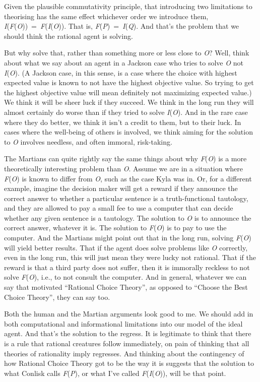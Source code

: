 \documentclass[
  11pt,
  letterpaper,
  DIV=11,
  numbers=noendperiod,
  twoside]{scrartcl}
\begin{document}
Given the plausible commutativity principle, that introducing two
limitations to theorising has the same effect whichever order we
introduce them,
\emph{I}(\emph{F}(\emph{O}))~=~\emph{F}(\emph{I}(\emph{O})). That is,
\emph{F}(\emph{P})~=~\emph{I}(\emph{Q}). And that's the problem that we
should think the rational agent is solving.

But why solve that, rather than something more or less close to
\emph{O}? Well, think about what we say about an agent in a Jackson case
who tries to solve \emph{O} not \emph{I}(\emph{O}). (A Jackson case, in
this sense, is a case where the choice with highest expected value is
known to not have the highest objective value. So trying to get the
highest objective value will mean definitely not maximizing expected
value.) We think it will be sheer luck if they succeed. We think in the
long run they will almost certainly do worse than if they tried to solve
\emph{I}(\emph{O}). And in the rare case where they do better, we think
it isn't a credit to them, but to their luck. In cases where the
well-being of others is involved, we think aiming for the solution to
\emph{O} involves needless, and often immoral, risk-taking.

The Martians can quite rightly say the same things about why
\emph{F}(\emph{O}) is a more theoretically interesting problem than
\emph{O}. Assume we are in a situation where \emph{F}(\emph{O}) is known
to differ from \emph{O}, such as the case Kyla was in. Or, for a
different example, imagine the decision maker will get a reward if they
announce the correct answer to whether a particular sentence is a
truth-functional tautology, and they are allowed to pay a small fee to
use a computer that can decide whether any given sentence is a
tautology. The solution to \emph{O} is to announce the correct answer,
whatever it is. The solution to \emph{F}(\emph{O}) is to pay to use the
computer. And the Martians might point out that in the long run, solving
\emph{F}(\emph{O}) will yield better results. That if the agent does
solve problems like \emph{O} correctly, even in the long run, this will
just mean they were lucky not rational. That if the reward is that a
third party does not suffer, then it is immorally reckless to not solve
\emph{F}(\emph{O}), i.e., to not consult the computer. And in general,
whatever we can say that motivated ``Rational Choice Theory'', as
opposed to ``Choose the Best Choice Theory'', they can say too.

Both the human and the Martian arguments look good to me. We should add
in both computational and informational limitations into our model of
the ideal agent. And that's the solution to the regress. It is
legitimate to think that there is a rule that rational creatures follow
immediately, on pain of thinking that all theories of rationality imply
regresses. And thinking about the contingency of how Rational Choice
Theory got to be the way it is suggests that the solution to what
Conlisk calls \emph{F}(\emph{P}), or what I've called
\emph{F}(\emph{I}(\emph{O})), will be that point.
\end{document}
